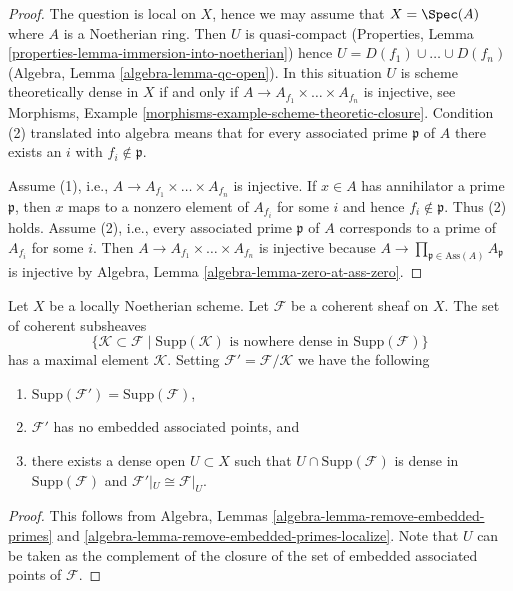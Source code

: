 \begin{proof}
The question is local on $X$, hence we may assume that $X = \Spec(A)$
where $A$ is a Noetherian ring. Then $U$ is quasi-compact
(Properties, Lemma \ref{properties-lemma-immersion-into-noetherian})
hence $U = D(f_1) \cup \ldots \cup D(f_n)$
(Algebra, Lemma \ref{algebra-lemma-qc-open}).
In this situation $U$ is scheme theoretically dense in $X$ if and only if
$A \to A_{f_1} \times \ldots \times A_{f_n}$ is injective, see
Morphisms, Example \ref{morphisms-example-scheme-theoretic-closure}.
Condition (2) translated into algebra means that for every associated
prime $\mathfrak p$ of $A$ there exists an $i$ with $f_i \not \in \mathfrak p$.

\medskip\noindent
Assume (1), i.e., $A \to A_{f_1} \times \ldots \times A_{f_n}$ is injective.
If $x \in A$ has annihilator a prime $\mathfrak p$, then $x$ maps
to a nonzero element of $A_{f_i}$ for some $i$ and hence
$f_i \not \in \mathfrak p$. Thus (2) holds.
Assume (2), i.e., every associated prime $\mathfrak p$ of $A$
corresponds to a prime of $A_{f_i}$ for some $i$. Then
$A \to A_{f_1} \times \ldots \times A_{f_n}$ is injective because
$A \to \prod_{\mathfrak p \in \text{Ass}(A)} A_\mathfrak p$ is injective
by Algebra, Lemma \ref{algebra-lemma-zero-at-ass-zero}.
\end{proof}

\begin{lemma}
\label{lemma-remove-embedded-points}
Let $X$ be a locally Noetherian scheme.
Let $\mathcal{F}$ be a coherent sheaf on $X$.
The set of coherent subsheaves
$$
\{
\mathcal{K} \subset \mathcal{F}
\mid
\text{Supp}(\mathcal{K})\text{ is nowhere dense in }\text{Supp}(\mathcal{F})
\}
$$
has a maximal element $\mathcal{K}$.
Setting $\mathcal{F}' = \mathcal{F}/\mathcal{K}$ we have the
following
\begin{enumerate}
\item $\text{Supp}(\mathcal{F}') = \text{Supp}(\mathcal{F})$,
\item $\mathcal{F}'$ has no embedded associated points, and
\item there exists a dense open $U \subset X$ such that
$U \cap \text{Supp}(\mathcal{F})$ is dense in $\text{Supp}(\mathcal{F})$
and $\mathcal{F}'|_U \cong \mathcal{F}|_U$.
\end{enumerate}
\end{lemma}

\begin{proof}
This follows from
Algebra, Lemmas \ref{algebra-lemma-remove-embedded-primes} and
\ref{algebra-lemma-remove-embedded-primes-localize}.
Note that $U$ can be taken as the complement of the closure
of the set of embedded associated points of $\mathcal{F}$.
\end{proof}

